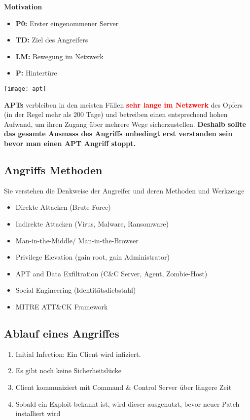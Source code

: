 \begin{minipage}{0.5\linewidth}
    \textbf{Motivation}
    \begin{itemize}
        \item \textbf{P0:} Erster eingenommener Server
        \item \textbf{TD:} Ziel des Angreifers
        \item \textbf{LM:} Bewegung im Netzwerk
        \item \textbf{P:} Hintertüre
    \end{itemize}
\end{minipage}
\begin{minipage}{0.5\linewidth}
    \texttt{[image: apt]}\\
\end{minipage}

\textbf{APTs} verbleiben in den meisten Fällen \textcolor{red}{\textbf{sehr lange im Netzwerk}} des Opfers (in der Regel mehr als 200 Tage) und betreiben einen entsprechend hohen Aufwand, um ihren Zugang über mehrere Wege sicherzustellen. 
\textbf{Deshalb sollte das gesamte Ausmass des Angriffs unbedingt erst verstanden sein bevor man einen APT Angriff stoppt.}

\subsection{Angriffs Methoden}
Sie verstehen die Denkweise der Angreifer und deren Methoden und Werkzeuge

\begin{itemize}
    \item Direkte Attacken (Brute-Force)
    \item Indirekte Attacken (Virus, Malware, Ransomware)
    \item Man-in-the-Middle/ Man-in-the-Browser
    \item Privilege Elevation (gain root, gain Administrator)
    \item APT and Data Exfiltration (C\&C Server, Agent, Zombie-Host)
    \item Social Engineering (Identitätsdiebstahl)
    \item MITRE ATT\&CK Framework
\end{itemize}

\subsection{Ablauf eines Angriffes}
\begin{enumerate}
    \item Initial Infection: Ein Client wird infiziert.
    \item Es gibt noch keine Sicherheitslücke
    \item Client kommuniziert mit Command \& Control Server über längere Zeit
    \item Sobald ein Exploit bekannt ist, wird dieser ausgenutzt, bevor neuer Patch installiert wird
\end{enumerate}


